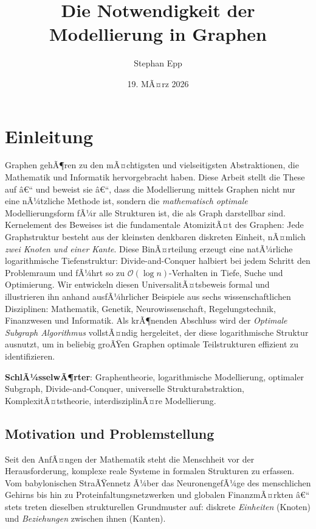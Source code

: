 ﻿\documentclass[12pt,a4paper,twoside]{article}
\title{\textbf{Die Notwendigkeit der \\Modellierung in Graphen}}
\author{Stephan Epp}
\date{19. MÃ¤rz 2026}
\theoremstyle{definition}
\theoremstyle{plain}
\theoremstyle{remark}
\begin{document}

\maketitle

\tableofcontents
\newpage

\section{Einleitung}
\label{sec:einleitung}
Graphen gehÃ¶ren zu den mÃ¤chtigsten und vielseitigsten Abstraktionen,
die Mathematik und Informatik hervorgebracht haben.  Diese Arbeit
stellt die These auf â€“ und beweist sie â€“, dass die Modellierung
mittels Graphen nicht nur eine nÃ¼tzliche Methode ist, sondern die
\emph{mathematisch optimale} Modellierungsform fÃ¼r alle Strukturen
ist, die als Graph darstellbar sind.  Kernelement des Beweises ist
die fundamentale AtomizitÃ¤t des Graphen: Jede Graphstruktur besteht
aus der kleinsten denkbaren diskreten Einheit, nÃ¤mlich
\emph{zwei Knoten und einer Kante}.  Diese BinÃ¤rteilung erzeugt
eine natÃ¼rliche logarithmische Tiefenstruktur: Divide-and-Conquer
halbiert bei jedem Schritt den Problemraum und fÃ¼hrt so zu
$\mathcal{O}(\log n)$-Verhalten in Tiefe, Suche und Optimierung.
Wir entwickeln diesen UniversalitÃ¤tsbeweis formal und illustrieren
ihn anhand ausfÃ¼hrlicher Beispiele aus sechs wissenschaftlichen
Disziplinen: Mathematik, Genetik, Neurowissenschaft, Regelungs\-technik,
Finanzwesen und Informatik.  Als krÃ¶nenden Abschluss wird der
\emph{Optimale Subgraph Algorithmus} vollstÃ¤ndig hergeleitet,
der diese logarithmische Struktur ausnutzt, um in beliebig groÃŸen
Graphen optimale Teilstrukturen effizient zu identifizieren.

\textbf{SchlÃ¼sselwÃ¶rter}: Graphentheorie, logarithmische Modellierung, optimaler Subgraph,
Divide-and-Conquer, universelle Strukturabstraktion,
KomplexitÃ¤tstheorie, interdisziplinÃ¤re Modellierung.

\subsection{Motivation und Problemstellung}

Seit den AnfÃ¤ngen der Mathematik steht die Menschheit vor der
Herausforderung, komplexe reale Systeme in formalen Strukturen
zu erfassen.  Vom babylonischen StraÃŸennetz Ã¼ber das NeuronengefÃ¼ge
des menschlichen Gehirns bis hin zu Proteinfaltungsnetzwerken und
globalen FinanzmÃ¤rkten â€“ stets treten dieselben strukturellen
Grundmuster auf: diskrete \emph{Einheiten} (Knoten) und
\emph{Beziehungen} zwischen ihnen (Kanten).
\end{document}
